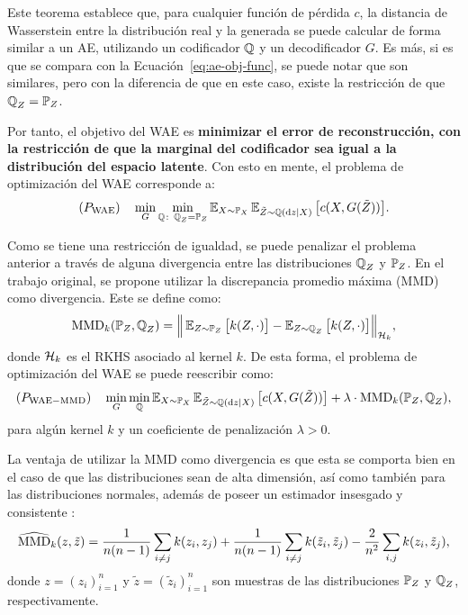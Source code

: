 Este teorema establece que, para cualquier función de pérdida $c$, la distancia de Wasserstein entre la distribución real y la generada se puede calcular de forma similar a un AE, utilizando un codificador $\ProbQ$ y un decodificador $G$. Es más, si es que se compara con la Ecuación~\eqref{eq:ae-obj-func}, se puede notar que son similares, pero con la diferencia de que en este caso, existe la restricción de que $\ProbQ_Z = \Prob_Z$.

Por tanto, el objetivo del WAE es \textbf{minimizar el error de reconstrucción, con la restricción de que la marginal del codificador sea igual a la distribución del espacio latente}. Con esto en mente, el problema de optimización del WAE corresponde a:
\begin{equation}
    (P_{\mathrm{WAE}}) \quad \min_{G} \min_{\ProbQ\colon \ProbQ_Z = \Prob_Z} \Exp_{X\sim\Prob_X} \Exp_{\tilde Z\sim\ProbQ(\dd z \mid X)} \qty\big[ c(X, G(\tilde Z)) ].
\end{equation}

Como se tiene una restricción de igualdad, se puede penalizar el problema anterior a través de alguna divergencia entre las distribuciones $\ProbQ_Z$ y $\Prob_Z$. En el trabajo original, se propone utilizar la discrepancia promedio máxima (MMD) \cite{gretton2006kernel} como divergencia. Este se define como:
\begin{equation}
    \MMDOp_k(\Prob_Z, \ProbQ_Z) = \Big\|
    \Exp_{Z\sim\Prob_Z} \qty\big[ k(Z, \cdot) ] - \Exp_{Z\sim\ProbQ_Z} \qty\big[ k(Z, \cdot) ]
    \Big\|_{\cH_k},
\end{equation}
donde $\mathcal{H}_k$ es el RKHS asociado al kernel $k$. De esta forma, el problema de optimización del WAE se puede reescribir como:
\begin{equation}
    (P_{\mathrm{WAE-MMD}}) \quad \min_{G} \min_{\ProbQ} \Exp_{X\sim\Prob_X} \Exp_{\tilde Z\sim\ProbQ(\dd z \mid X)} \qty\big[ c(X, G(\tilde Z)) ] + \lambda \cdot \MMDOp_{k}(\Prob_Z, \ProbQ_Z),
\end{equation}
para algún kernel $k$ y un coeficiente de penalización $\lambda > 0$.

La ventaja de utilizar la MMD como divergencia es que esta se comporta bien en el caso de que las distribuciones sean de alta dimensión, así como también para las distribuciones normales, además de poseer un estimador insesgado y consistente \cite{gretton2012kernel}:
\begin{equation}
    \widehat {\operatorname{MMD}}_k(z, \tilde z)
    = \frac{1}{n(n-1)} \sum_{i\neq j} k(z_i, z_j)
    + \frac{1}{n(n-1)} \sum_{i\neq j} k(\tilde z_i, \tilde z_j)
    - \frac{2}{n^2} \sum_{i, j} k(z_i, \tilde z_j),
\end{equation}
donde $z = (z_i)_{i=1}^{n}$ y $\tilde z = (\tilde z_i)_{i=1}^{n}$ son muestras de las distribuciones $\Prob_Z$ y $\ProbQ_Z$, respectivamente.

